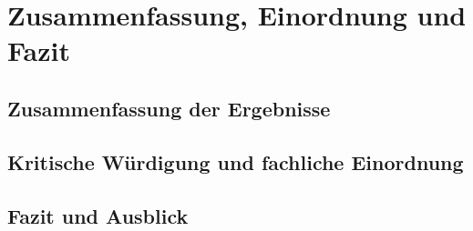 \chapter{Zusammenfassung, Einordnung und Fazit}

\section{Zusammenfassung der Ergebnisse}

\section{Kritische Würdigung und fachliche Einordnung}

\section{Fazit und Ausblick}
